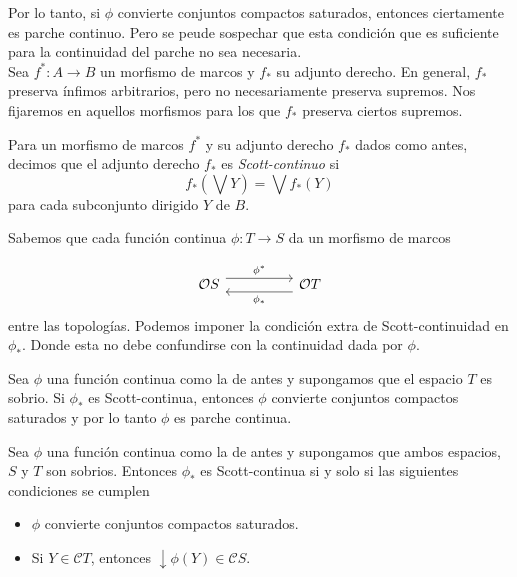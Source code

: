 Por lo tanto, si $\phi$ convierte conjuntos compactos saturados, entonces ciertamente es parche continuo. Pero se peude sospechar que esta condición que es suficiente para la continuidad del parche no sea necesaria.\\

Sea $f^*\colon A\to B$ un morfismo de marcos y $f_*$ su adjunto derecho. En general, $f_*$ preserva ínfimos arbitrarios, pero no necesariamente preserva supremos. Nos fijaremos en aquellos morfismos para los que $f_*$ preserva ciertos supremos.

\begin{dfn}\label{Scottcontino}
    Para un morfismo de marcos $f^*$ y su adjunto derecho $f_*$ dados como antes, decimos que el adjunto derecho $f_*$ es \emph{Scott-continuo} si 
    \[
    f_*(\bigvee Y)=\bigvee f_*(Y)
    \]
    para cada subconjunto dirigido $Y$ de $B$.
\end{dfn}

Sabemos que cada función continua $\phi\colon T\to S$ da un morfismo de marcos 

\[\begin{tikzcd}
	{\mathcal{O}S} && {\mathcal{O}T}
	\arrow["{\phi^*}", shift left=2, from=1-1, to=1-3]
	\arrow["{\phi_*}", shift left=2, from=1-3, to=1-1]
\end{tikzcd}\]
entre las topologías. Podemos imponer la condición extra de Scott-continuidad en $\phi_*$. Donde esta no debe confundirse con la continuidad dada por $\phi$.

\begin{lem}\label{Pcontinua y Scontinua}
    Sea $\phi$ una función continua como la de antes y supongamos que el espacio $T$ es sobrio. Si $\phi_*$ es Scott-continua, entonces $\phi$ convierte conjuntos compactos saturados y por lo tanto $\phi$ es parche continua.
\end{lem}

\begin{thm}
    Sea $\phi$ una función continua como la de antes y supongamos que ambos espacios, $S$ y $T$ son sobrios. Entonces $\phi_*$ es Scott-continua si y solo si las siguientes condiciones se cumplen
    \begin{itemize}
        \item $\phi$ convierte conjuntos compactos saturados.
        \item Si $Y\in \mathcal{C}T$, entonces $\downarrow \phi(Y)\in \mathcal{C}S$.
    \end{itemize}
\end{thm}

